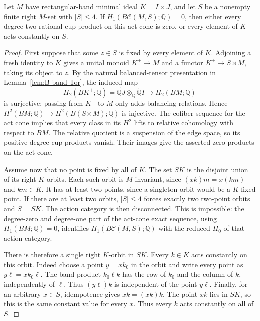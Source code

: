 \begin{lemma}
\label{C:four-state-band-dichotomy}
Let $M$ have rectangular-band minimal ideal $K=I\times J$, and
let $S$ be a nonempty finite right $M$-set with $|S|\leq4$.
If $H_1(B\mathcal C(M,S);\mathbb Q)=0$, then either every
degree-two rational cup product on this act cone is zero, or
every element of $K$ acts constantly on $S$.
\end{lemma}
\begin{proof}
First suppose that some $z\in S$ is fixed by every element of
$K$.  Adjoining a fresh identity to $K$ gives a unital monoid
$K^+\to M$ and a functor $K^+\to S\rtimes M$, taking its object
to $z$.  By the natural balanced-tensor presentation in
Lemma~\ref{lem:B-band-Tor}, the induced map
\[
 H_2(BK^+;\mathbb Q)
   =\widetilde{\mathbb QJ}\otimes_{\mathbb Q}
      \widetilde{\mathbb QI}
   \longrightarrow H_2(BM;\mathbb Q)
\]
is surjective: passing from $K^+$ to $M$ only adds balancing
relations.  Hence $H^2(BM;\mathbb Q)\to H^2(B(S\rtimes M);\mathbb Q)$
is injective.  The cofiber sequence for the act cone implies that
every class in its $H^2$ lifts to relative cohomology with respect
to $BM$.  The relative quotient is a suspension of the edge
space, so its positive-degree cup products vanish.  Their images
give the asserted zero products on the act cone.

Assume now that no point is fixed by all of $K$.  The set $SK$
is the disjoint union of its right $K$-orbits.  Each such orbit
is $M$-invariant, since $(xk)m=x(km)$ and $km\in K$.
It has at least two points, since a singleton orbit would be a
$K$-fixed point.  If there are at least two orbits, $|S|\leq4$
forces exactly two two-point orbits and $S=SK$.  The action
category is then disconnected.  This is impossible: the
degree-zero and degree-one part of the act-cone exact sequence,
using $H_1(BM;\mathbb Q)=0$, identifies
$H_1(B\mathcal C(M,S);\mathbb Q)$ with the reduced $H_0$ of
that action category.

There is therefore a single right $K$-orbit in $SK$.
Every $k\in K$ acts constantly on this orbit.  Indeed choose a
point $y=xk_0$ in the orbit and write every point as
$y\ell=xk_0\ell$.  The band product $k_0\ell k$ has the row
of $k_0$ and the column of $k$, independently of $\ell$.
Thus $(y\ell)k$ is independent of the point $y\ell$.
Finally, for an arbitrary $x\in S$, idempotence gives
$xk=(xk)k$.  The point $xk$ lies in $SK$, so this is the same
constant value for every $x$.  Thus every $k$ acts constantly
on all of $S$.
\end{proof}

